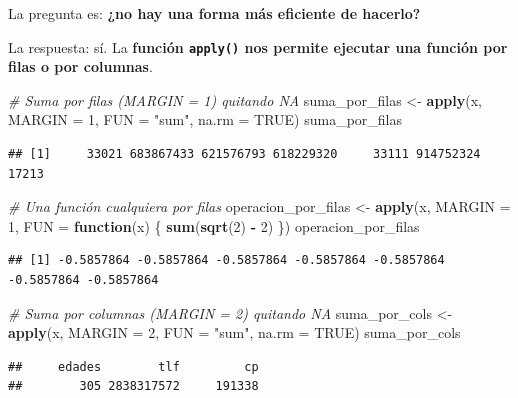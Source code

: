 \documentclass[11pt,]{book}
\newenvironment{Shaded}{\begin{snugshade}}{\end{snugshade}}
\newcommand{\CommentTok}[1]{\textcolor[rgb]{0.37,0.37,0.37}{\textit{#1}}}
\newcommand{\ControlFlowTok}[1]{\textcolor[rgb]{0.27,0.27,0.27}{\textbf{#1}}}
\newcommand{\DataTypeTok}[1]{\textcolor[rgb]{0.27,0.27,0.27}{#1}}
\newcommand{\DecValTok}[1]{\textcolor[rgb]{0.06,0.06,0.06}{#1}}
\newcommand{\KeywordTok}[1]{\textcolor[rgb]{0.27,0.27,0.27}{\textbf{#1}}}
\newcommand{\NormalTok}[1]{#1}
\newcommand{\OperatorTok}[1]{\textcolor[rgb]{0.43,0.43,0.43}{\textbf{#1}}}
\newcommand{\OtherTok}[1]{\textcolor[rgb]{0.37,0.37,0.37}{#1}}
\newcommand{\StringTok}[1]{\textcolor[rgb]{0.5,0.5,0.5}{#1}}
\begin{document}
La pregunta es: \textbf{¿no hay una forma más eficiente de hacerlo?}

La respuesta: sí. La \textbf{función \texttt{apply()} nos permite ejecutar una función por filas o por columnas}.

\begin{Shaded}
\begin{Highlighting}[]
\CommentTok{# Suma por filas (MARGIN = 1) quitando NA}
\NormalTok{suma_por_filas <-}\StringTok{ }\KeywordTok{apply}\NormalTok{(x, }\DataTypeTok{MARGIN =} \DecValTok{1}\NormalTok{, }\DataTypeTok{FUN =} \StringTok{"sum"}\NormalTok{, }\DataTypeTok{na.rm =} \OtherTok{TRUE}\NormalTok{)}
\NormalTok{suma_por_filas }
\end{Highlighting}
\end{Shaded}

\begin{verbatim}
## [1]     33021 683867433 621576793 618229320     33111 914752324     17213
\end{verbatim}

\begin{Shaded}
\begin{Highlighting}[]
\CommentTok{# Una función cualquiera por filas}
\NormalTok{operacion_por_filas <-}\StringTok{ }\KeywordTok{apply}\NormalTok{(x, }\DataTypeTok{MARGIN =} \DecValTok{1}\NormalTok{, }\DataTypeTok{FUN =} \ControlFlowTok{function}\NormalTok{(x) \{ }\KeywordTok{sum}\NormalTok{(}\KeywordTok{sqrt}\NormalTok{(}\DecValTok{2}\NormalTok{) }\OperatorTok{-}\StringTok{ }\DecValTok{2}\NormalTok{) \})}
\NormalTok{operacion_por_filas}
\end{Highlighting}
\end{Shaded}

\begin{verbatim}
## [1] -0.5857864 -0.5857864 -0.5857864 -0.5857864 -0.5857864 -0.5857864 -0.5857864
\end{verbatim}

\begin{Shaded}
\begin{Highlighting}[]
\CommentTok{# Suma por columnas (MARGIN = 2) quitando NA}
\NormalTok{suma_por_cols <-}\StringTok{ }\KeywordTok{apply}\NormalTok{(x, }\DataTypeTok{MARGIN =} \DecValTok{2}\NormalTok{, }\DataTypeTok{FUN =} \StringTok{"sum"}\NormalTok{, }\DataTypeTok{na.rm =} \OtherTok{TRUE}\NormalTok{)}
\NormalTok{suma_por_cols}
\end{Highlighting}
\end{Shaded}

\begin{verbatim}
##     edades        tlf         cp 
##        305 2838317572     191338
\end{verbatim}
\end{document}
